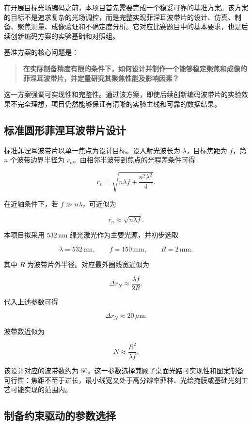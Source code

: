 \documentclass[UTF8,a4paper,11pt]{ctexart}
\begin{document}
在开展目标光场编码之前，本项目首先需要完成一个稳妥可靠的基准方案。该方案的目标不是追求复杂的光场调控，而是完整实现菲涅耳波带片的设计、仿真、制备、聚焦测量、成像验证和不确定度分析。它对应比赛题目中的基本要求，也是后续创新编码方案的实验基础和对照组。

基准方案的核心问题是：

\begin{quote}
\textbf{在实际制备精度有限的条件下，如何设计并制作一个能够稳定聚焦和成像的菲涅耳波带片，并定量研究其聚焦性能及影响因素？}
\end{quote}

这一方案强调可实现性和完整性。通过该方案，即使后续创新编码波带片的实验效果不完全理想，项目仍然能够保证有清晰的实验主线和可靠的数据结果。

\subsection{标准圆形菲涅耳波带片设计}

标准菲涅耳波带片以单一焦点为设计目标。设入射光波长为 $\lambda$，目标焦距为 $f$，第 $n$ 个波带边界半径为 $r_n$。由相邻半波带到焦点的光程差条件可得

\[
r_n=\sqrt{n\lambda f+\frac{n^2\lambda^2}{4}}.
\]

在近轴条件下，若 $f\gg n\lambda$，可近似为

\[
r_n\approx \sqrt{n\lambda f}.
\]

本项目拟采用 $532\,\mathrm{nm}$ 绿光激光作为主要光源，并初步选取

\[
\lambda=532\,\mathrm{nm},\qquad
f=150\,\mathrm{mm},\qquad
R=2\,\mathrm{mm}.
\]

其中 $R$ 为波带片外半径。对应最外圈线宽近似为

\[
\Delta r_N\approx \frac{\lambda f}{2R}.
\]

代入上述参数可得

\[
\Delta r_N\approx 20\,\mu\mathrm{m}.
\]

波带数近似为

\[
N\approx \frac{R^2}{\lambda f}.
\]

该设计对应的波带数约为 $50$。这一参数选择兼顾了桌面光路可实现性和图案制备可行性：焦距不至于过长，最小线宽又处于高分辨率菲林、光绘掩膜或基础光刻工艺可能实现的范围内。

\subsection{制备约束驱动的参数选择}
\end{document}
